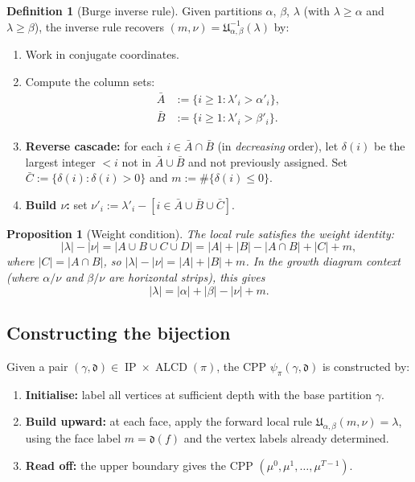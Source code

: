 \documentclass[11pt]{article}
\newcommand{\IP}{\operatorname{IP}}
\newcommand{\ALCD}{\operatorname{ALCD}}
\theoremstyle{plain}
\newtheorem{proposition}[theorem]{Proposition}
\theoremstyle{definition}
\newtheorem{definition}[theorem]{Definition}
\begin{document}
\begin{definition}[Burge inverse rule]
\label{def:burge-inverse}
Given partitions $\alpha$, $\beta$, $\lambda$ (with $\lambda \geq \alpha$
and $\lambda \geq \beta$), the inverse rule recovers $(m, \nu) =
\mathfrak{U}_{\alpha,\beta}^{-1}(\lambda)$ by:
\begin{enumerate}
  \item Work in conjugate coordinates.
  \item Compute the column sets:
    \begin{align*}
      \bar{A} &:= \{i \geq 1 : \lambda'_i > \alpha'_i\}, \\
      \bar{B} &:= \{i \geq 1 : \lambda'_i > \beta'_i\}.
    \end{align*}
  \item \textbf{Reverse cascade:} for each $i \in \bar{A} \cap \bar{B}$
    (in \emph{decreasing} order), let $\delta(i)$ be the largest
    integer $< i$ not in $\bar{A} \cup \bar{B}$ and not previously
    assigned.
    Set $\bar{C} := \{\delta(i) : \delta(i) > 0\}$ and
    $m := \#\{\delta(i) \leq 0\}$.
  \item \textbf{Build $\nu$:} set $\nu'_i := \lambda'_i -
    [i \in \bar{A} \cup \bar{B} \cup \bar{C}]$.
\end{enumerate}
\end{definition}

\begin{proposition}[Weight condition]
\label{prop:weight}
The local rule satisfies the weight identity:
\begin{equation}\label{eq:weight-cond}
  |\lambda| - |\nu| = |A \cup B \cup C \cup D|
  = |A| + |B| - |A \cap B| + |C| + m,
\end{equation}
where $|C| = |A \cap B|$, so $|\lambda| - |\nu| = |A| + |B| + m$.
In the growth diagram context (where $\alpha/\nu$ and $\beta/\nu$ are
horizontal strips), this gives
\begin{equation}\label{eq:weight-growth}
  |\lambda| = |\alpha| + |\beta| - |\nu| + m.
\end{equation}
\end{proposition}


\subsection{Constructing the bijection}

Given a pair $(\gamma, \mathfrak{d}) \in \IP \times \ALCD(\pi)$, the
CPP $\psi_\pi(\gamma, \mathfrak{d})$ is constructed by:
\begin{enumerate}
  \item \textbf{Initialise:} label all vertices at sufficient depth
    with the base partition $\gamma$.
  \item \textbf{Build upward:} at each face, apply the forward local
    rule $\mathfrak{U}_{\alpha,\beta}(m, \nu) = \lambda$, using the
    face label $m = \mathfrak{d}(f)$ and the vertex labels already
    determined.
  \item \textbf{Read off:} the upper boundary gives the CPP
    $(\mu^0, \mu^1, \ldots, \mu^{T-1})$.
\end{enumerate}
\end{document}
